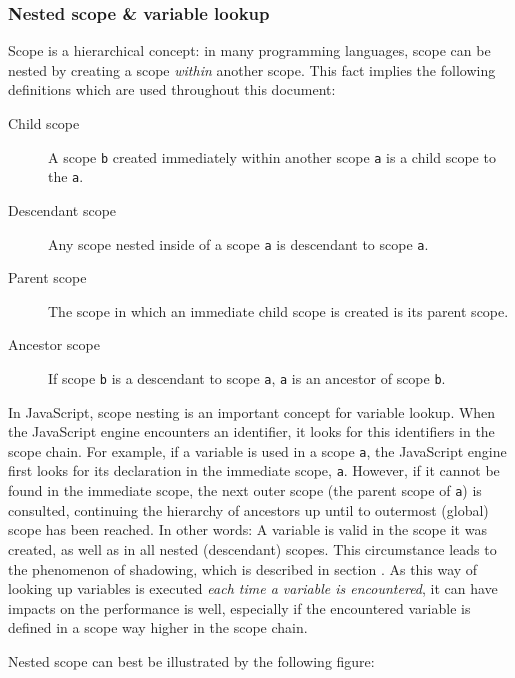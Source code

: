 \subsubsection{Nested scope \& variable
lookup}\label{nested-scope-variable-lookup}

Scope is a hierarchical concept: in many programming languages, scope
can be nested by creating a scope \emph{within} another scope. This fact
implies the following definitions which are used throughout this
document:

\begin{description}
\item[Child scope]
A scope \texttt{b} created immediately within another scope \texttt{a}
is a child scope to the \texttt{a}.
\item[Descendant scope]
Any scope nested inside of a scope \texttt{a} is descendant to scope
\texttt{a}.
\item[Parent scope]
The scope in which an immediate child scope is created is its parent
scope.
\item[Ancestor scope]
If scope \texttt{b} is a descendant to scope \texttt{a}, \texttt{a} is
an ancestor of scope \texttt{b}.
\end{description}

In JavaScript, scope nesting is an important concept for variable
lookup. When the JavaScript engine encounters an identifier, it looks
for this identifiers in the scope chain. For example, if a variable is
used in a scope \texttt{a}, the JavaScript engine first looks for its
declaration in the immediate scope, \texttt{a}. However, if it cannot be
found in the immediate scope, the next outer scope (the parent scope of
\texttt{a}) is consulted, continuing the hierarchy of ancestors up until
to outermost (global) scope has been reached. In other words: A variable
is valid in the scope it was created, as well as in all nested
(descendant) scopes. This circumstance leads to the phenomenon of
shadowing, which is described in section
. As this way of looking up variables
is executed \emph{each time a variable is encountered}, it can have
impacts on the performance is well, especially if the encountered
variable is defined in a scope way higher in the scope chain.

Nested scope can best be illustrated by the following figure:

